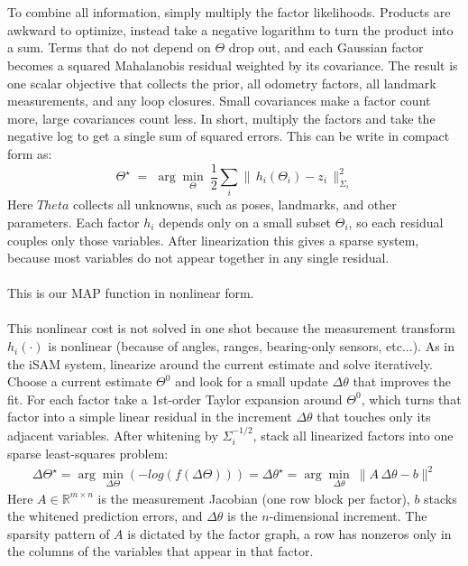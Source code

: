 \\ \\
To combine all information, simply multiply the factor likelihoods. Products are awkward to optimize, instead take a negative logarithm to turn the product into a sum. Terms that do not depend on $\Theta$ drop out, and each Gaussian factor becomes a squared Mahalanobis residual weighted by its covariance. The result is one scalar objective that collects the prior, all odometry factors, all landmark measurements, and any loop closures. Small covariances make a factor count more, large covariances count less. In short, multiply the factors and take the negative log to get a single sum of squared errors. This can be write in compact form as:
\[
    \Theta^\star \;=\;\arg\min_{\Theta}\ \frac12\sum_i \|\,h_i(\Theta_i)-z_i\,\|^2_{\Sigma_i}
\]
Here $Theta$ collects all unknowns, such as poses, landmarks, and other parameters. Each factor $h_i$ depends only on a small subset $\Theta_i$, so each residual couples only those variables. After linearization this gives a sparse system, because most variables do not appear together in any single residual.
\\ \\
This is our MAP function in nonlinear form.
\\ \\
This nonlinear cost is not solved in one shot because the measurement transform $h_i(\cdot)$ is nonlinear (because of angles, ranges, bearing-only sensors, etc...). As in the iSAM system, linearize around the current estimate and solve iteratively. Choose a current estimate $\Theta^0$ and look for a small update $\Delta\theta$ that improves the fit. For each factor take a 1st-order Taylor expansion around $\Theta^0$, which turns that factor into a simple linear residual in the increment $\Delta\theta$ that touches only its adjacent variables. After whitening by $\Sigma_i^{-1/2}$, stack all linearized factors into one sparse least-squares problem:
\begin{equation}
    \begin{aligned}
        \Delta\Theta^\star = \arg\min_{\Delta\Theta} \left( -log\left(f(\Delta\Theta)\right) \right) = \Delta\theta^\star = \arg\min_{\Delta\theta}\ \|A\,\Delta\theta - b\|^2
    \end{aligned}
    \label{eq:optimizer-iSAM2-least-square}
\end{equation}
Here $A\in\mathbb{R}^{m\times n}$ is the measurement Jacobian (one row block per factor), $b$ stacks the whitened prediction errors, and $\Delta\theta$ is the $n$-dimensional increment. The sparsity pattern of $A$ is dictated by the factor graph, a row has nonzeros only in the columns of the variables that appear in that factor.
